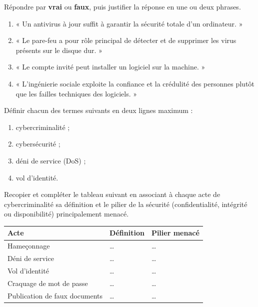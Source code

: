 \documentclass[11pt]{article}
\begin{document}
\begin{exercice}
Répondre par \textbf{vrai} ou \textbf{faux}, puis justifier la réponse en une ou deux phrases.
\begin{enumerate}
\item « Un antivirus à jour suffit à garantir la sécurité totale d'un ordinateur. »
\item « Le pare-feu a pour rôle principal de détecter et de supprimer les virus présents sur le disque dur. »
\item « Le compte invité peut installer un logiciel sur la machine. »
\item « L'ingénierie sociale exploite la confiance et la crédulité des personnes plutôt que les failles techniques des logiciels. »
\end{enumerate}
\end{exercice}

\begin{exercice}[Définitions]
Définir chacun des termes suivants en deux lignes maximum :
\begin{enumerate}
\item cybercriminalité ;
\item cybersécurité ;
\item déni de service (DoS) ;
\item vol d'identité.
\end{enumerate}
\end{exercice}

\begin{exercice}
Recopier et compléter le tableau suivant en associant à chaque acte de cybercriminalité sa définition et le pilier de la sécurité (confidentialité, intégrité ou disponibilité) principalement menacé.

\begin{center}
\begin{tabularx}{\linewidth}{|l|X|l|}
\hline
\rowcolor{popblueL} \textbf{Acte} & \textbf{Définition} & \textbf{Pilier menacé} \\
\hline
Hameçonnage & \ldots & \ldots \\
\hline
Déni de service & \ldots & \ldots \\
\hline
Vol d'identité & \ldots & \ldots \\
\hline
Craquage de mot de passe & \ldots & \ldots \\
\hline
Publication de faux documents & \ldots & \ldots \\
\hline
\end{tabularx}
\end{center}
\end{exercice}
\end{document}
